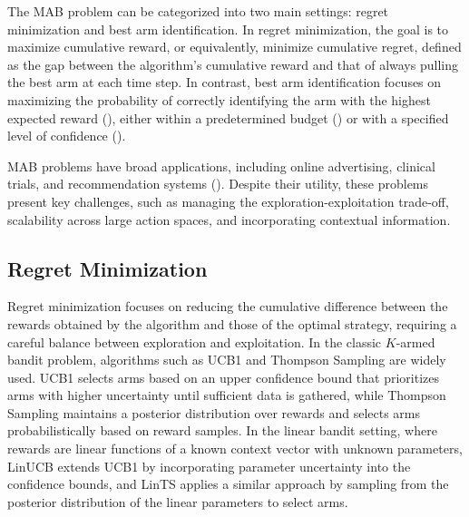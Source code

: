 \documentclass[accepted]{uai2025} %
\theoremstyle{plain}
\theoremstyle{definition}
\theoremstyle{remark}
\begin{document}
The MAB problem can be categorized into two main settings: regret minimization and best arm identification. In regret minimization, the goal is to maximize cumulative reward, or equivalently, minimize cumulative regret, defined as the gap between the algorithm’s cumulative reward and that of always pulling the best arm at each time step. In contrast, best arm identification focuses on maximizing the probability of correctly identifying the arm with the highest expected reward (\cite{maron1997racing}), either within a predetermined budget (\cite{gabillon2012best, komiyama2022minimax}) or with a specified level of confidence (\cite{kalyanakrishnan2012pac, kuroki2020polynomial}).

MAB problems have broad applications, including online advertising, clinical trials, and recommendation systems (\cite{kuleshov2014algorithms,bouneffouf2019survey}). Despite their utility, these problems present key challenges, such as managing the exploration-exploitation trade-off, scalability across large action spaces, and incorporating contextual information.

\vspace{-.1in}
\subsection{Regret Minimization}\vspace{-.1in}

Regret minimization focuses on reducing the cumulative difference between the rewards obtained by the algorithm and those of the optimal strategy, requiring a careful balance between exploration and exploitation. In the classic $K$-armed bandit problem, algorithms such as UCB1 \cite{auer2002finite} and Thompson Sampling \cite{dc35850b-2ca1-314f-9e0d-470713436b17} are widely used. UCB1 selects arms based on an upper confidence bound that prioritizes arms with higher uncertainty until sufficient data is gathered, while Thompson Sampling maintains a posterior distribution over rewards and selects arms probabilistically based on reward samples. In the linear bandit setting, where rewards are linear functions of a known context vector with unknown parameters, LinUCB \cite{abbasi2011improved} extends UCB1 by incorporating parameter uncertainty into the confidence bounds, and LinTS \cite{agrawal2013thompson} applies a similar approach by sampling from the posterior distribution of the linear parameters to select arms.

\vspace{-.1in}
\end{document}

